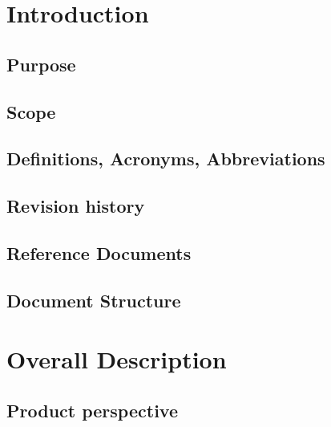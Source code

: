 \documentclass[10pt,openany]{book}
\begin{document}
\chapter{Introduction}

	\section{Purpose}

		

	\section{Scope}

		

	\section{Definitions, Acronyms, Abbreviations}

		

	\section{Revision history}

		

	\section{Reference Documents}

		

	\section{Document Structure}

		

\chapter{Overall Description}\label{chapt:sum}

	\section{Product perspective}
\end{document}
